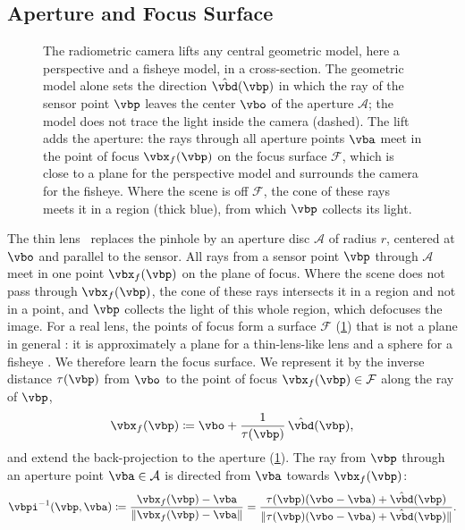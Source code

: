 \subsection{Aperture and Focus Surface}
\label{sec:defocus}
\begin{figure}[t]
        \centering
        
        \caption{The radiometric camera lifts any central geometric model, here a perspective and a fisheye model, in a cross-section. The geometric model alone sets the direction $\hat{\vbd}(\vbp)$ in which the ray of the sensor point $\vbp$ leaves the center $\vbo$ of the aperture $\mathcal{A}$; the model does not trace the light inside the camera (dashed). The lift adds the aperture: the rays through all aperture points $\vba$ meet in the point of focus $\vbx_f(\vbp)$ on the focus surface $\mathcal{F}$, which is close to a plane for the perspective model and surrounds the camera for the fisheye. Where the scene is off $\mathcal{F}$, the cone of these rays meets it in a region (thick blue), from which $\vbp$ collects its light.}
        \label{fig:model}
\end{figure}
The thin lens~\cite{pharr2023physically} replaces the pinhole by an
aperture disc $\mathcal{A}$ of radius $r$, centered at $\vbo$ and
parallel to the sensor. All rays from a sensor point $\vbp$ through
$\mathcal{A}$ meet in one point $\vbx_f(\vbp)$ on the plane of focus.
Where the scene does not pass through $\vbx_f(\vbp)$, the cone of
these rays intersects it in a region and not in a point, and $\vbp$
collects the light of this whole region, which defocuses the image. For a real
lens, the points of focus form a surface $\mathcal{F}$
(\cref{fig:model}) that is not a plane in general \cite{Hecht+2023}: it is approximately a plane for a
thin-lens-like lens and a sphere for a fisheye
\cite{Kingslake2010,wide-field-of-view-2017}. We therefore learn the
focus surface. We represent it by the inverse distance $\tau(\vbp)$
from $\vbo$ to the point of focus $\vbx_f(\vbp)\in\mathcal{F}$ along
the ray of $\vbp$,
\begin{equation}
    \vbx_f(\vbp) \coloneqq \vbo + \frac{1}{\tau(\vbp)}\,\hat{\vbd}(\vbp),
\end{equation}
and extend the back-projection to the aperture
(\cref{fig:model}). The ray from $\vbp$
through an aperture point $\vba\in\mathcal{A}$ is directed from
$\vba$ towards $\vbx_f(\vbp)$:
\begin{equation}
\label{eq:lifted-back-projection}
    \vbpi^{-1}(\vbp,\vba)
    \coloneqq \frac{\vbx_f(\vbp) - \vba}{\lVert \vbx_f(\vbp) - \vba \rVert}
    = \frac{\tau(\vbp)(\vbo-\vba) + \hat{\vbd}(\vbp)}{\lVert\tau(\vbp)(\vbo-\vba) + \hat{\vbd}(\vbp)\rVert}.
\end{equation}
